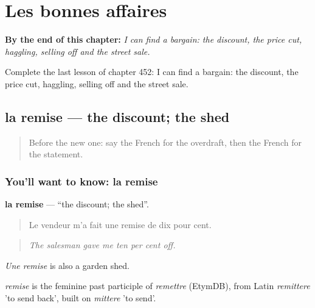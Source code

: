
\chapter{Les bonnes affaires}
\label{ch:fr-les-bonnes-affaires}

\begin{chapteropening}
\textbf{By the end of this chapter:} \emph{I can find a bargain: the discount, the price cut, haggling, selling off and the street sale.}

Complete the last lesson of chapter 452: I can find a bargain: the discount, the price cut, haggling, selling off and the street sale.
\end{chapteropening}

\section[la remise]{la remise — the discount; the shed}

\label{lesson:FR-C452-remise}



\begin{quote}
Before the new one: say the French for the overdraft, then the French for the statement.
\end{quote}

\subsection*{You'll want to know: la remise}
\textbf{la remise} — \textquotedblleft{}the discount; the shed\textquotedblright{}.

\begin{quote}
Le vendeur m'a fait une remise de dix pour cent.
\end{quote}

\begin{quote}
\emph{The salesman gave me ten per cent off.}
\end{quote}

\emph{Une remise} is also a garden shed.

\begin{cousinweb}
\emph{remise} is the feminine past participle of \emph{remettre} (EtymDB), from Latin \emph{remittere} 'to send back', built on \emph{mittere} 'to send'.
\end{cousinweb}

